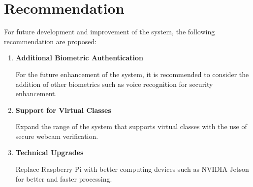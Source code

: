 \section{Recommendation}

For future development and improvement of the system, the following recommendation are proposed:

\begin{enumerate}
	\item \textbf{Additional Biometric Authentication}
	
	For the future enhancement of the system, it is recommended to consider the addition of other biometrics such as voice recognition for security enhancement.
	
	\item \textbf{Support for Virtual Classes}
	
	Expand the range of the system that supports virtual classes with the use of secure webcam verification.
	
	\item \textbf{Technical Upgrades}
	
	Replace Raspberry Pi with better computing devices such as NVIDIA Jetson for better and faster processing.
	
\end{enumerate}
